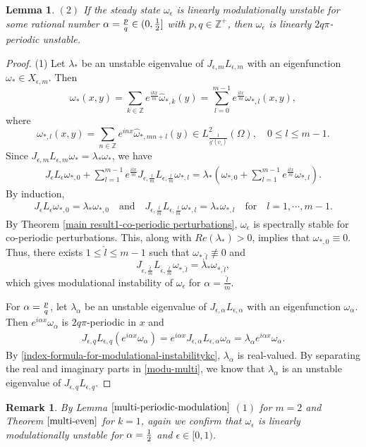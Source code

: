 \documentclass[1 [leqno, 11pt]{amsart}
\numberwithin{equation}{section}
\let\ep=\epsilon
\newtheorem{lemma}[Theorem]{Lemma}
\newtheorem{remark}[Theorem]{Remark}
\begin{document}
\begin{CJK*}{GBK}{song}
\begin{lemma}
$(2)$ If the steady state $\omega_\ep$ is linearly modulationally unstable
for some rational number $\alpha={p\over q}\in (0,{1\over2}]$ with $p,q\in\mathbb{Z}^+$, then $\omega_\ep$ is linearly  $2q\pi$-periodic unstable.
\end{lemma}
\begin{proof} (1) Let ${\lambda}_* $  be an unstable eigenvalue of $J_{\ep,m} L_{\ep,m} $ with an eigenfunction ${\omega}_*\in X_{\ep,m}$. Then
$${\omega}_*(x, y) = \sum_{k \in \mathbb{Z}} e^{\frac{ikx}{m}} \widehat{\omega}_{*,k}(y)  = \sum_{l = 0}^{m-1} e^{\frac{ilx}{m}} \omega_{*, l} (x, y), $$
where
$$\omega_{*, l} (x, y) = \sum_{n \in \mathbb{Z}} e^{inx} \widehat{\omega}_{*,mn + l}(y) \in L^2_{\frac {1} {g'(\psi_\epsilon)}}(\Omega),\quad 0\leq l\leq m-1.$$
Since $J_{\ep,m} L_{\ep,m}{\omega}_*={\lambda}_*{\omega}_*$, we have
\begin{align*}
J_\ep L_\ep {\omega}_{*, 0} + \sum_{l = 1}^{m-1} e^{\frac{ilx}{m}} J_{\ep, \frac{l}{m}}L_{\ep, \frac{l}{m}} {\omega}_{*, l} = {\lambda}_* \left({\omega}_{*, 0} + \sum_{l = 1}^{m-1} e^{\frac{ilx}{m}} {\omega}_{*, l}\right).
\end{align*}
By induction,
\begin{align*}
J_\ep L_\ep {\omega}_{*, 0} = {\lambda}_* {\omega}_{*, 0}\quad\text{and}\quad
J_{\ep, \frac{l}{m}}L_{\ep, \frac{l}{m}} {\omega}_{*, l}  = {\lambda}_* {\omega}_{*, l}  \quad\text{for} \quad l = 1, \cdots, m-1.
\end{align*}
By Theorem \ref{main result1-co-periodic perturbations},
 $\omega_\ep$ is spectrally stable for co-periodic perturbations. This, along with $Re({\lambda}_*)>0$,  implies that
${\omega}_{*, 0}\equiv 0$. Thus, there exists $1 \leq  \hat{l} \leq m - 1$ such that
$ {\omega}_{*,\hat{l}} \not\equiv 0$ and
$$J_{\ep, \frac{\hat{l}}{m}}L_{\ep, \frac{\hat{l}}{m}} {\omega}_{*, \hat{l}} = {\lambda}_*{\omega}_{*, \hat{l}},$$
which gives modulational instability of $\omega_\ep$ for $\alpha = \frac{\hat{l}}{m}$.

For $\alpha={p\over q}$, let $\lambda_\alpha$ be an unstable eigenvalue of $J_{\ep, \alpha}L_{\ep, \alpha}$ with an eigenfunction $\omega_\alpha$. Then  $e^{i\alpha x}\omega_\alpha$ is $2q\pi$-periodic in $x$ and
\begin{align}\label{modu-multi}J_{\ep,q}L_{\ep,q}(e^{i\alpha x}\omega_\alpha )=e^{i\alpha x}J_{\ep, \alpha}L_{\ep, \alpha}\omega_\alpha=\lambda_\alpha e^{i\alpha x}\omega_\alpha.
\end{align}
By \eqref{index-formula-for-modulational-instabilitykc}, $\lambda_\alpha$ is real-valued. By separating the real and imaginary parts in \eqref{modu-multi}, we know that $\lambda_\alpha$ is an unstable eigenvalue of $J_{\ep,q}L_{\ep,q}$.
\end{proof}
\begin{remark}
By Lemma $\ref{multi-periodic-modulation}$ $(1)$ for $m=2$ and Theorem $\ref{multi-even}$ for $k=1$,  again we confirm  that $\omega_\ep$ is linearly modulationally unstable
for $\alpha={1\over 2}$ and $\ep\in[0,1)$.


\end{remark}
\end{CJK*}
\end{document}

